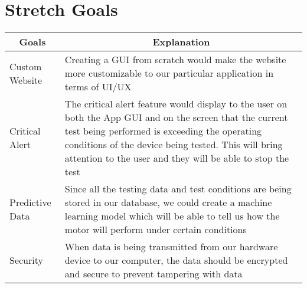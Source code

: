 \documentclass{article}
\begin{document}
\section{Stretch Goals}
    \begin{table}[H]
        \centering
        \begin{tabular}{|p{4cm}|p{8cm}|}
        \hline
        \multicolumn{1}{|c|}{\textbf{Goals}} & \multicolumn{1}{c|}{\textbf{Explanation}} 
        \\ \hline
        Custom Website
        &  Creating a GUI from scratch would make the website more customizable to our particular application in terms of UI/UX   
        \newline                              
        \\ \hline
        Critical Alert                              
        & The critical alert feature would display to the user on both the App GUI and on the screen that the current test being performed is exceeding the operating conditions of the device being tested. This will bring attention to the user and they will be able to stop the test
        \newline
        \\ \hline
        Predictive Data                              
        & Since all the testing data and test conditions are being stored in our database, we could create a machine learning model which will be able to tell us how the motor will perform under certain conditions                         
        \newline       
        \\ \hline
        Security                              
        & When data is being transmitted from our hardware device to our computer, the data should be encrypted and secure to prevent tampering with data
        \newline                           
        \\ \hline
        \end{tabular}
    \end{table}
\end{document}
